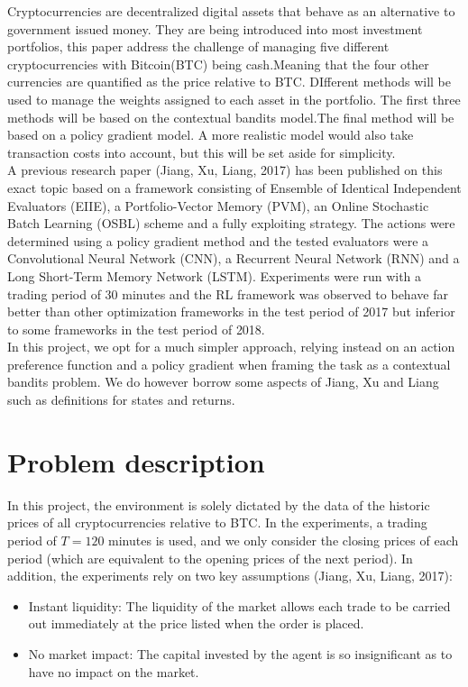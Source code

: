 \documentclass[a4paper,12pt]{article}
\begin{document}
Cryptocurrencies are decentralized digital assets that behave as an alternative to government issued money. They are being introduced into most investment portfolios, this paper address the challenge of managing five different cryptocurrencies with Bitcoin(BTC) being cash.Meaning that the four other currencies are quantified as the price relative to BTC.  DIfferent methods will be used to manage the weights assigned to each asset in the portfolio. The first three methods will be based on the contextual bandits model.The final method will be based on a policy gradient model. A more realistic model would also take transaction costs into account, but this will be set aside for simplicity. \\

A previous research paper (Jiang, Xu, Liang, 2017) has been published on this exact topic based on a framework consisting of Ensemble of Identical Independent Evaluators (EIIE), a Portfolio-Vector Memory (PVM), an Online Stochastic Batch Learning (OSBL) scheme and a fully exploiting strategy. The actions were determined using a policy gradient method and the tested evaluators were a Convolutional Neural Network (CNN), a Recurrent Neural Network (RNN) and a Long Short-Term Memory Network (LSTM). Experiments were run with a trading period of 30 minutes and the RL framework was observed to behave far better than other optimization frameworks in the test period of 2017 but inferior to some frameworks in the test period of 2018. \\

In this project, we opt for a much simpler approach, relying instead on an action preference function and a policy gradient when framing the task as a contextual bandits problem. We do however borrow some aspects of Jiang, Xu and Liang such as definitions for states and returns. \\

\section{Problem description}
In this project, the environment is solely dictated by the data of the historic prices of all cryptocurrencies relative to BTC. In the experiments, a trading period of $T = 120$ minutes is used, and we only consider the closing prices of each period (which are equivalent to the opening prices of the next period). In addition, the experiments rely on two key assumptions (Jiang, Xu, Liang, 2017):

\begin{itemize}
  \item Instant liquidity: The liquidity of the market allows each trade to be carried out immediately at the price listed when the order is placed.
  \item No market impact: The capital invested by the agent is so insignificant as to have no impact on the market.
\end{itemize}
\end{document}
